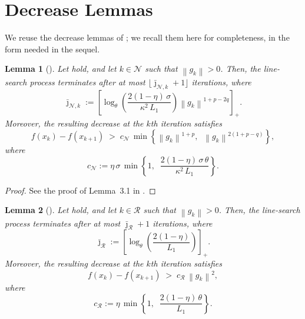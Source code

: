 \documentclass[11pt,a4paper]{article}
\theoremstyle{plain}
\newtheorem{lemma}{Lemma}
\theoremstyle{definition}
\newcommand{\norm}[1]{\left\|#1\right\|}
\newcommand{\Lone}{L_{1}}
\newcommand{\setN}{\mathcal{N}}
\newcommand{\setR}{\mathcal{R}}
\newcommand{\cN}{c_{\setN}}
\begin{document}
\section{Decrease Lemmas}\label{sec:decrease}


We reuse the decrease lemmas of \cite{RoyerChan2022}; we recall them here for completeness, in the form needed in the sequel.

\begin{lemma}[]\label{lem:line-search-N}
Let  hold, and let $k \in \setN$ such that $\norm{g_{k}} > 0$. Then, the line-search process terminates after at most $\lfloor \bar{\jmath}_{\setN, k} + 1 \rfloor$ iterations, where
\begin{equation}\label{eq:jbar-N}
\bar{\jmath}_{\setN, k}
:= \left[ \log_{\theta}\!\left( \frac{2(1-\eta)\,\sigma}{\kappa^{2}\,\Lone}\right)
\norm{g_{k}}^{1+p-2q} \right]_{+}.
\end{equation}
Moreover, the resulting decrease at the $k$th iteration satisfies
\begin{equation}\label{eq:decrease-N}
f(x_{k}) - f(x_{k+1})
\;>\; \cN \,\min\!\left\{ \norm{g_{k}}^{1+p},\;\; \norm{g_{k}}^{2(1+p-q)} \right\},
\end{equation}
where
\begin{equation}\label{eq:cN}
\cN := \eta\,\sigma\,\min\!\left\{ 1,\;\; \frac{2(1-\eta)\,\sigma\,\theta}{\kappa^{2}\,\Lone} \right\}.
\end{equation}
\end{lemma}

\begin{proof}
See the proof of Lemma~3.1 in \cite{RoyerChan2022}.
\end{proof}


\begin{lemma}[]\label{lem:line-search-R}
Let  hold, and let $k \in \setR$ such that $\norm{g_{k}} > 0$. Then, the line-search process terminates after at most $\bar{\jmath}_{\setR} + 1$ iterations, where
\begin{equation}\label{eq:jbar-R}
\bar{\jmath}_{\setR}
:= \left[ \log_{\theta}\!\left( \frac{2(1-\eta)}{\Lone}\right) \right]_{+}.
\end{equation}
Moreover, the resulting decrease at the $k$th iteration satisfies
\begin{equation}\label{eq:decrease-R}
f(x_{k}) - f(x_{k+1})
\;>\; c_{\setR}\,\norm{g_{k}}^{2},
\end{equation}
where
\begin{equation}\label{eq:cR}
c_{\setR} := \eta\,\min\!\left\{ 1,\;\; \frac{2(1-\eta)\,\theta}{\Lone} \right\}.
\end{equation}
\end{lemma}
\end{document}
